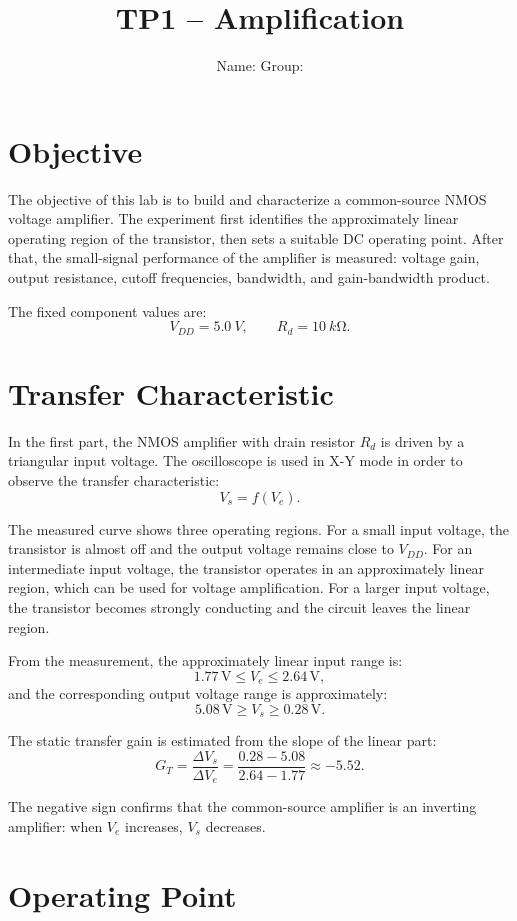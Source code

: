 \documentclass[11pt,a4paper]{article}
\title{TP1 -- Amplification}
\author{Name: \underline{\hspace{5cm}} \qquad Group: \underline{\hspace{3cm}}}
\date{}
\begin{document}
\maketitle

\section{Objective}

The objective of this lab is to build and characterize a common-source NMOS voltage amplifier. The experiment first identifies the approximately linear operating region of the transistor, then sets a suitable DC operating point. After that, the small-signal performance of the amplifier is measured: voltage gain, output resistance, cutoff frequencies, bandwidth, and gain-bandwidth product.

The fixed component values are:
\[
V_{DD}=\SI{5.0}{V}, \qquad R_d=\SI{10}{k\ohm}.
\]

\section{Transfer Characteristic}

In the first part, the NMOS amplifier with drain resistor $R_d$ is driven by a triangular input voltage. The oscilloscope is used in X-Y mode in order to observe the transfer characteristic:
\[
V_s=f(V_e).
\]

The measured curve shows three operating regions. For a small input voltage, the transistor is almost off and the output voltage remains close to $V_{DD}$. For an intermediate input voltage, the transistor operates in an approximately linear region, which can be used for voltage amplification. For a larger input voltage, the transistor becomes strongly conducting and the circuit leaves the linear region.

From the measurement, the approximately linear input range is:
\[
1.77\,\mathrm{V} \leq V_e \leq 2.64\,\mathrm{V},
\]
and the corresponding output voltage range is approximately:
\[
5.08\,\mathrm{V} \geq V_s \geq 0.28\,\mathrm{V}.
\]

The static transfer gain is estimated from the slope of the linear part:
\[
G_T=\frac{\Delta V_s}{\Delta V_e}
=\frac{0.28-5.08}{2.64-1.77}
\approx -5.52.
\]

The negative sign confirms that the common-source amplifier is an inverting amplifier: when $V_e$ increases, $V_s$ decreases.

\section{Operating Point}
\end{document}
